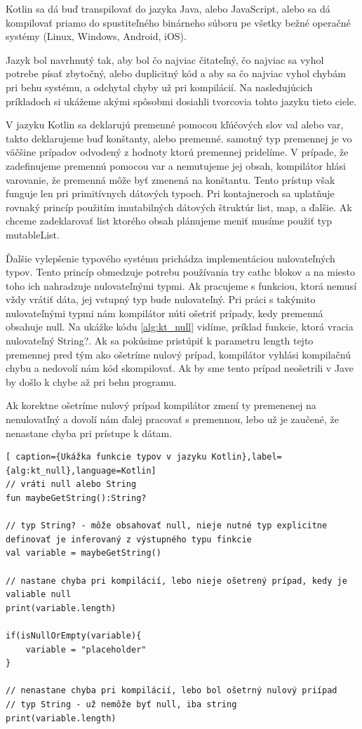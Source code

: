 Kotlin sa dá buď transpilovať do jazyka Java, alebo JavaScript, alebo sa dá kompilovať priamo do spustiteľného binárneho súboru pe všetky bežné operačné systémy (Linux, Windows, Android, iOS).

Jazyk bol navrhnutý tak, aby bol čo najviac čitateľný, čo najviac sa vyhol potrebe písať zbytočný, alebo duplicitný kód a aby sa čo najviac vyhol chybám pri behu systému, a odchytal chyby už pri kompilácií. Na nasledujúcich príkladoch si ukážeme akými spôsobmi dosiahli tvorcovia tohto jazyku tieto ciele. 

V jazyku Kotlin sa deklarujú premenné pomocou kľúčových slov val alebo var, takto deklarujeme buď konštanty, alebo premenné. samotný typ premennej je vo väčšine prípadov odvodený z hodnoty ktorú premennej pridelíme. V prípade, že zadefinujeme premennú pomocou var a nemutujeme jej obsah, kompilátor hlási varovanie, že premenná môže byť zmenená na konštantu. Tento prístup však funguje len pri primitívnych dátových typoch. Pri kontajneroch sa uplatňuje rovnaký princíp použitím imutabilných dátových štruktúr list, map, a ďalšie. Ak chceme zadeklarovať list ktorého obsah plánujeme meniť musíme použiť typ mutableList. 

Ďalšie vylepšenie typového systému prichádza implementáciou nulovateľných typov. Tento princíp obmedzuje potrebu používania try cathc blokov a na miesto toho ich nahradzuje nulovateľnými typmi. Ak pracujeme s funkciou, ktorá nemusí vždy vrátiť dáta, jej vstupný typ bude nulovateľný. Pri práci s takýmito nulovateľnými typmi nám kompilátor núti ošetriť prípady, kedy premenná obsahuje null. Na ukážke kódu \ref{alg:kt_null} vidíme, príklad funkcie, ktorá vracia nulovateľný String?. Ak sa pokúsime pristúpiť k parametru length tejto premennej pred tým ako ošetríme nulový prípad, kompilátor vyhlási kompilačnú chybu a nedovolí nám kód skompilovať. Ak by sme tento prípad neošetrili v Jave by došlo k chybe až pri behu programu. 

Ak korektne ošetríme nulový prípad kompilátor zmení ty premenenej na nenulovatľný a dovolí nám ďalej pracovať s premennou, lebo už je zaučené, že nenastane chyba pri prístupe k dátam. 


\begin{lstlisting}[ caption={Ukážka funkcie typov v jazyku Kotlin},label={alg:kt_null},language=Kotlin]
// vráti null alebo String
fun maybeGetString():String?

// typ String? - môže obsahovať null, nieje nutné typ explicitne definovať je inferovaný z výstupného typu finkcie
val variable = maybeGetString()

// nastane chyba pri kompilácií, lebo nieje ošetrený prípad, kedy je valiable null
print(variable.length)

if(isNullOrEmpty(variable){
	variable = "placeholder"
}

// nenastane chyba pri kompilácií, lebo bol ošetrný nulový priípad
// typ String - už nemôže byť null, iba string
print(variable.length)
\end{lstlisting}


